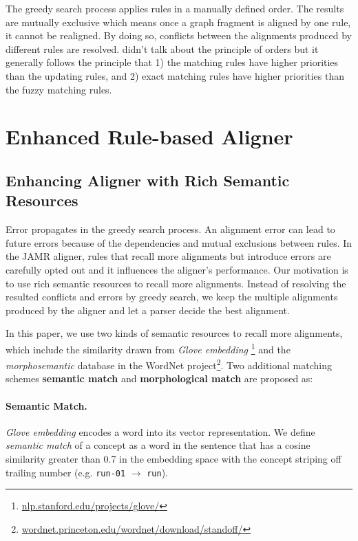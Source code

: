\documentclass[11pt,a4paper]{article}
\begin{document}
The greedy search process applies rules in a manually defined order.
The results are mutually exclusive which means
once a graph fragment is aligned by one rule, it cannot be realigned.
By doing so, conflicts between the alignments produced by 
different rules are resolved.
\citet{flanigan-EtAl:2014:P14-1} didn't talk about the principle of orders
but it generally follows the principle that 1) the matching rules have higher priorities
than the updating rules, 
and 2) exact matching rules have higher priorities than the fuzzy matching rules.

\section{Enhanced Rule-based Aligner}\label{sec:aligner}


\subsection{Enhancing Aligner with Rich Semantic Resources}

Error propagates in the greedy search process.
An alignment error can lead to future errors because of the
dependencies and mutual exclusions between rules.
In the JAMR aligner, rules that recall more
alignments but introduce errors are carefully
opted out and it influences the aligner's performance.
Our motivation is to use rich semantic resources
to recall more alignments.
Instead of resolving the resulted conflicts and errors by greedy search,
we keep the multiple alignments produced by the aligner
and let a parser decide the best alignment.

In this paper, we use two kinds of semantic resources to recall more
alignments, which include the similarity drawn
from \textit{Glove embedding} \cite{pennington-socher-manning:2014:EMNLP2014}\footnote{\url{nlp.stanford.edu/projects/glove/}} and
the {\it morphosemantic} database \cite{10.1007/978-3-642-04235-5_30} in the WordNet project\footnote{\url{wordnet.princeton.edu/wordnet/download/standoff/}}.
Two additional matching schemes {\bf semantic match} and {\bf morphological match} are proposed as:

\paragraph{Semantic Match.} \textit{Glove embedding}
encodes a word into its vector representation.
We define \textit{semantic match} of a concept
as a word in the sentence
that has a cosine similarity greater than 0.7 in the embedding space
with the concept striping off
trailing number (e.g. {\tt run-01} $\rightarrow$ {\tt run}).
\end{document}

